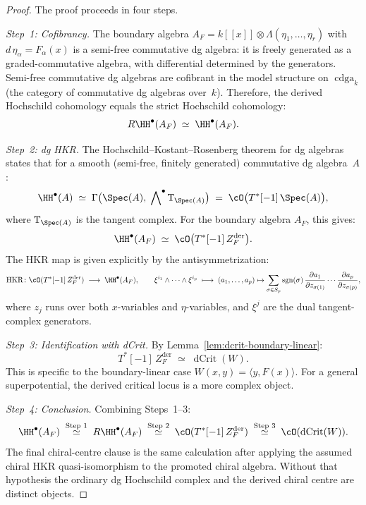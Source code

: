 \begin{proof}
The proof proceeds in four steps.

\emph{Step~1: Cofibrancy.}
The boundary algebra $A_F = k[[x]] \otimes \Lambda(\eta_1, \ldots,
\eta_r)$ with $d\,\eta_\alpha = F_\alpha(x)$ is a semi-free
commutative dg algebra: it is freely generated as a graded-commutative
algebra, with differential determined by the generators. Semi-free
commutative dg algebras are cofibrant in the model structure on
$\operatorname{cdga}_k$ (the category of commutative dg algebras
over~$k$). Therefore, the derived Hochschild cohomology equals the
strict Hochschild cohomology:
\[
R\HH^\bullet(A_F) \;\simeq\; \HH^\bullet(A_F).
\]

\emph{Step~2: dg HKR.}
The Hochschild--Kostant--Rosenberg theorem for dg algebras
states that for a smooth (semi-free, finitely generated)
commutative dg algebra~$A$:
\begin{equation}\label{eq:dg-hkr}
\HH^\bullet(A) \;\simeq\;
\Gamma\bigl(\Spec(A),\; \bigwedge\nolimits^\bullet
\mathbb{T}_{\Spec(A)}\bigr)
\;=\; \cO\bigl(T^*[-1]\, \Spec(A)\bigr),
\end{equation}
where $\mathbb{T}_{\Spec(A)}$ is the tangent complex.
For the boundary algebra $A_F$, this gives:
\[
\HH^\bullet(A_F) \;\simeq\;
\cO\bigl(T^*[-1]\, Z_F^{\mathrm{der}}\bigr).
\]
The HKR map is given explicitly by the antisymmetrization:
\begin{equation}\label{eq:hkr-explicit}
\operatorname{HKR}\colon
\cO(T^*[-1]\, Z_F^{\mathrm{der}})
\;\longrightarrow\;
\HH^\bullet(A_F), \qquad
\xi^{i_1} \wedge \cdots \wedge \xi^{i_p}
\;\longmapsto\;
(a_1, \ldots, a_p) \mapsto
\sum_{\sigma \in S_p}
\operatorname{sgn}(\sigma)\,
\frac{\partial a_1}{\partial z_{\sigma(1)}}
\cdots
\frac{\partial a_p}{\partial z_{\sigma(p)}},
\end{equation}
where $z_j$ runs over both $x$-variables and $\eta$-variables,
and $\xi^j$ are the dual tangent-complex generators.

\emph{Step~3: Identification with dCrit.}
By Lemma~\ref{lem:dcrit-boundary-linear}:
\[
T^*[-1]\, Z_F^{\mathrm{der}} \;\simeq\; \operatorname{dCrit}(W).
\]
This is specific to the boundary-linear case $W(x,y) = \langle y,
F(x) \rangle$. For a general superpotential, the derived critical
locus is a more complex object.

\emph{Step~4: Conclusion.}
Combining Steps~1--3:
\[
\HH^\bullet(A_F)
\;\overset{\text{Step 1}}{\simeq}\;
R\HH^\bullet(A_F)
\;\overset{\text{Step 2}}{\simeq}\;
\cO(T^*[-1]\, Z_F^{\mathrm{der}})
\;\overset{\text{Step 3}}{\simeq}\;
\cO(\operatorname{dCrit}(W)).
\]
The final chiral-centre clause is the same calculation after applying
the assumed chiral HKR quasi-isomorphism to the promoted chiral
algebra. Without that hypothesis the ordinary dg Hochschild complex and
the derived chiral centre are distinct objects.
\end{proof}

